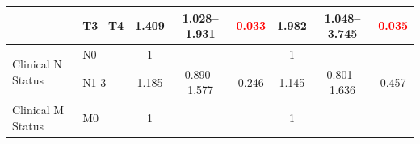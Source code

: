 \documentclass[
paper=landscape,
paper=160mm:90mm, %
fontsize=11pt, %
pagesize, %
parskip=half-, %
]{scrartcl} %
\theoremstyle{mythmstyle} %
\begin{document}
\begin{table}[H]
{\begin{tabular}{|l|l|c|c|c|c|c|c|}
\cline{2-8}
                                        & T3+T4                                                                               & 1.409                                                                          & 1.028--1.931                                                                   & \textcolor{red}{0.033}                                                        & 1.982                                                                          & 1.048--3.745                                                                   & \textcolor{red}{0.035}                                                         \\ 
\hline
\multirow{2}{*}{Clinical N Status}      & {\cellcolor[rgb]{0.62,0.812,0.878}}N0                                               & {\cellcolor[rgb]{0.62,0.812,0.878}}1                                           & {\cellcolor[rgb]{0.62,0.812,0.878}}                                           & {\cellcolor[rgb]{0.62,0.812,0.878}}                                           & {\cellcolor[rgb]{0.62,0.812,0.878}}1                                           & {\cellcolor[rgb]{0.62,0.812,0.878}}                                           & {\cellcolor[rgb]{0.62,0.812,0.878}}                                            \\ 
\cline{2-8}
                                        & N1-3                                                                                & 1.185                                                                          & 0.890--1.577                                                                   & 0.246                                                                         & 1.145                                                                          & 0.801--1.636                                                                   & 0.457                                                                          \\ 
\hline
\multirow{2}{*}{Clinical M Status}      & {\cellcolor[rgb]{0.62,0.812,0.878}}M0                                               & {\cellcolor[rgb]{0.62,0.812,0.878}}1                                           & {\cellcolor[rgb]{0.62,0.812,0.878}}                                           & {\cellcolor[rgb]{0.62,0.812,0.878}}                                           & {\cellcolor[rgb]{0.62,0.812,0.878}}1                                           & {\cellcolor[rgb]{0.62,0.812,0.878}}                                           & {\cellcolor[rgb]{0.62,0.812,0.878}}                                            \\ 

\end{tabular}}
\end{table}
\end{document}

